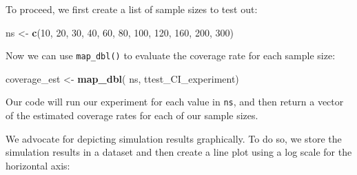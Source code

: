 \documentclass[
]{book}
\newenvironment{Shaded}{\begin{snugshade}}{\end{snugshade}}
\newcommand{\DecValTok}[1]{\textcolor[rgb]{0.00,0.00,0.81}{#1}}
\newcommand{\FunctionTok}[1]{\textcolor[rgb]{0.13,0.29,0.53}{\textbf{#1}}}
\newcommand{\NormalTok}[1]{#1}
\newcommand{\OtherTok}[1]{\textcolor[rgb]{0.56,0.35,0.01}{#1}}
\begin{document}
To proceed, we first create a list of sample sizes to test out:

\begin{Shaded}
\begin{Highlighting}[]
\NormalTok{ns }\OtherTok{\textless{}{-}} \FunctionTok{c}\NormalTok{(}\DecValTok{10}\NormalTok{, }\DecValTok{20}\NormalTok{, }\DecValTok{30}\NormalTok{, }\DecValTok{40}\NormalTok{, }\DecValTok{60}\NormalTok{, }\DecValTok{80}\NormalTok{, }\DecValTok{100}\NormalTok{, }\DecValTok{120}\NormalTok{, }\DecValTok{160}\NormalTok{, }\DecValTok{200}\NormalTok{, }\DecValTok{300}\NormalTok{)}
\end{Highlighting}
\end{Shaded}

Now we can use \texttt{map\_dbl()} to evaluate the coverage rate for each sample size:

\begin{Shaded}
\begin{Highlighting}[]
\NormalTok{coverage\_est }\OtherTok{\textless{}{-}} \FunctionTok{map\_dbl}\NormalTok{( ns, ttest\_CI\_experiment)}
\end{Highlighting}
\end{Shaded}

Our code will run our experiment for each value in \texttt{ns}, and then return a vector of the estimated coverage rates for each of our sample sizes.

We advocate for depicting simulation results graphically.
To do so, we store the simulation results in a dataset and then create a line plot using a log scale for the horizontal axis:
\end{document}
